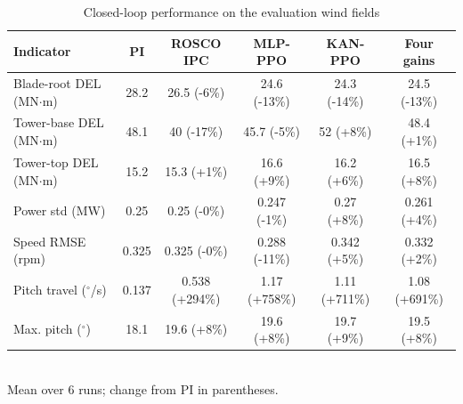\begin{table}[!t]
\centering
\caption{Closed-loop performance on the evaluation wind fields}
\label{tab:performance}
\renewcommand{\arraystretch}{1.15}
\begin{tabular}{lccccc}
\hline\hline
Indicator & PI & ROSCO IPC & MLP-PPO & KAN-PPO & Four gains \\
\hline
Blade-root DEL (MN$\cdot$m) & 28.2 & 26.5 (-6\%) & 24.6 (-13\%) & 24.3 (-14\%) & 24.5 (-13\%) \\
Tower-base DEL (MN$\cdot$m) & 48.1 & 40 (-17\%) & 45.7 (-5\%) & 52 (+8\%) & 48.4 (+1\%) \\
Tower-top DEL (MN$\cdot$m) & 15.2 & 15.3 (+1\%) & 16.6 (+9\%) & 16.2 (+6\%) & 16.5 (+8\%) \\
Power std (MW) & 0.25 & 0.25 (-0\%) & 0.247 (-1\%) & 0.27 (+8\%) & 0.261 (+4\%) \\
Speed RMSE (rpm) & 0.325 & 0.325 (-0\%) & 0.288 (-11\%) & 0.342 (+5\%) & 0.332 (+2\%) \\
Pitch travel ($^\circ$/s) & 0.137 & 0.538 (+294\%) & 1.17 (+758\%) & 1.11 (+711\%) & 1.08 (+691\%) \\
Max. pitch ($^\circ$) & 18.1 & 19.6 (+8\%) & 19.6 (+8\%) & 19.7 (+9\%) & 19.5 (+8\%) \\
\hline\hline
\end{tabular}
\\[2pt]\footnotesize Mean over 6 runs; change from PI in parentheses.
\end{table}
